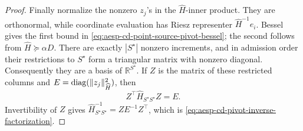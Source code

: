 \begin{proof}
Finally normalize the nonzero \(z_j\)'s in the \(\widehat H\)-inner product.
They are orthonormal, while coordinate evaluation has Riesz representer
\(\widehat H^{-1}e_i\).  Bessel gives the first bound in
\cref{eq:aesp-cd-point-source-pivot-bessel}; the second follows from
\(\widehat H\succeq\alpha D\).
There are exactly $|S^\star|$ nonzero increments, and in admission order
their restrictions to $S^\star$ form a triangular matrix with nonzero
diagonal.  Consequently they are a basis of $\mathbb R^{S^\star}$.  If $Z$
is the matrix of these restricted columns and
$E=\operatorname{diag}(\lVert z_j\rVert_{\widehat H}^2)$, then
\begin{equation*}
 Z^\top\widehat H_{S^\star S^\star}Z=E.
\end{equation*}
Invertibility of $Z$ gives
$\widehat H_{S^\star S^\star}^{-1}=ZE^{-1}Z^\top$, which is
\cref{eq:aesp-cd-pivot-inverse-factorization}.
\end{proof}

